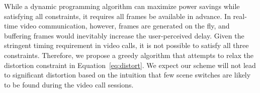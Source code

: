%
%


While a dynamic programming algorithm can maximize power savings while satisfying all constraints, 
it requires all frames be available in advance. 
In real-time video communication, however, frames are generated on the fly, 
and buffering frames would inevitably increase the user-perceived delay. 
Given the stringent timing requirement in video calls, 
it is not possible to satisfy all three constraints.
Therefore, we propose a greedy algorithm that attempts to relax the distortion constraint
in Equation~\ref{eq:distort}. We expect our scheme will not lead to significant
distortion based on the intuition that few scene switches are
likely to be found during the video call sessions. 


